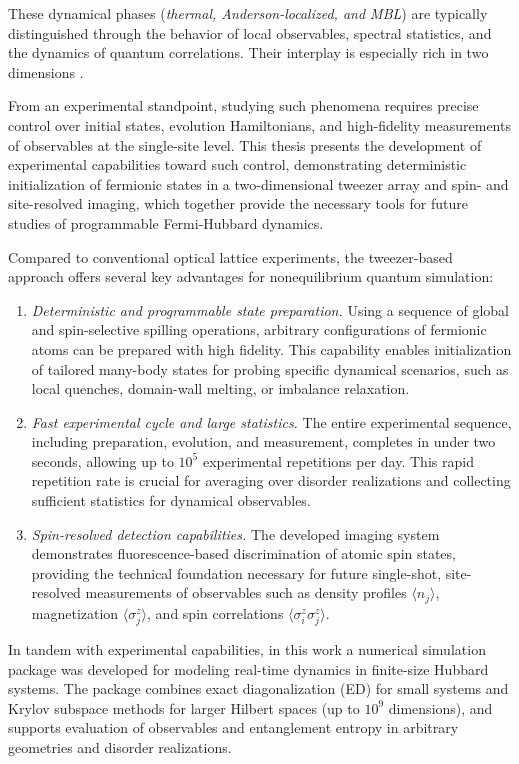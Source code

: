 These dynamical phases (\emph{thermal, Anderson-localized, and MBL}) are typically distinguished through the behavior of local observables, spectral statistics, and the dynamics of quantum correlations. Their interplay is especially rich in two dimensions \cite{abanin_colloquium_2019}.

From an experimental standpoint, studying such phenomena requires precise control over initial states, evolution Hamiltonians, and high-fidelity measurements of observables at the single-site level. This thesis presents the development of experimental capabilities toward such control, demonstrating deterministic initialization of fermionic states in a two-dimensional tweezer array and spin- and site-resolved imaging, which together provide the necessary tools for future studies of programmable Fermi-Hubbard dynamics.

Compared to conventional optical lattice experiments, the tweezer-based approach offers several key advantages for nonequilibrium quantum simulation:
\begin{enumerate}
	\item \textit{Deterministic and programmable state preparation.} Using a sequence of global and spin-selective spilling operations, arbitrary configurations of fermionic atoms can be prepared with high fidelity. This capability enables initialization of tailored many-body states for probing specific dynamical scenarios, such as local quenches, domain-wall melting, or imbalance relaxation.
	\item \textit{Fast experimental cycle and large statistics.} The entire experimental sequence, including preparation, evolution, and measurement, completes in under two seconds, allowing up to $10^5$ experimental repetitions per day. This rapid repetition rate is crucial for averaging over disorder realizations and collecting sufficient statistics for dynamical observables.
	\item \textit{Spin-resolved detection capabilities.} The developed imaging system demonstrates fluorescence-based discrimination of atomic spin states, providing the technical foundation necessary for future single-shot, site-resolved measurements of observables such as density profiles $\langle n_j \rangle$, magnetization $\langle \sigma^z_j \rangle$, and spin correlations $\langle \sigma^z_i \sigma^z_j \rangle$.
\end{enumerate}

In tandem with experimental capabilities, in this work a numerical simulation package was developed for modeling real-time dynamics in finite-size Hubbard systems. The package combines exact diagonalization (ED) for small systems and Krylov subspace methods for larger Hilbert spaces (up to $10^9$ dimensions), and supports evaluation of observables and entanglement entropy in arbitrary geometries and disorder realizations.

